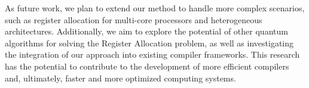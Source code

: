 As future work, we plan to extend our method to handle more complex scenarios, such as register allocation for multi-core processors and heterogeneous architectures. Additionally, we aim to explore the potential of other quantum algorithms for solving the Register Allocation problem, as well as investigating the integration of our approach into existing compiler frameworks. This research has the potential to contribute to the development of more efficient compilers and, ultimately, faster and more optimized computing systems.

